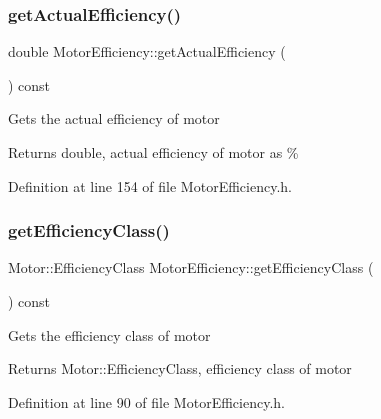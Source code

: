 \subsubsection{\texorpdfstring{get\+Actual\+Efficiency()}{getActualEfficiency()}\hspace{0.1cm}{\footnotesize\ttfamily [3/3]}}
{\footnotesize\ttfamily double Motor\+Efficiency\+::get\+Actual\+Efficiency (\begin{DoxyParamCaption}{ }\end{DoxyParamCaption}) const\hspace{0.3cm}{\ttfamily [inline]}}

Gets the actual efficiency of motor \begin{DoxyReturn}{Returns}
double, actual efficiency of motor as \% 
\end{DoxyReturn}


Definition at line 154 of file Motor\+Efficiency.\+h.

\mbox{\label{class_motor_efficiency_a9eb7d5c2fc598f655c1a3d12790e4d17}} 
\subsubsection{\texorpdfstring{get\+Efficiency\+Class()}{getEfficiencyClass()}\hspace{0.1cm}{\footnotesize\ttfamily [1/3]}}
{\footnotesize\ttfamily Motor\+::\+Efficiency\+Class Motor\+Efficiency\+::get\+Efficiency\+Class (\begin{DoxyParamCaption}{ }\end{DoxyParamCaption}) const\hspace{0.3cm}{\ttfamily [inline]}}

Gets the efficiency class of motor \begin{DoxyReturn}{Returns}
Motor\+::\+Efficiency\+Class, efficiency class of motor 
\end{DoxyReturn}


Definition at line 90 of file Motor\+Efficiency.\+h.

\mbox{\label{class_motor_efficiency_a9eb7d5c2fc598f655c1a3d12790e4d17}} 
